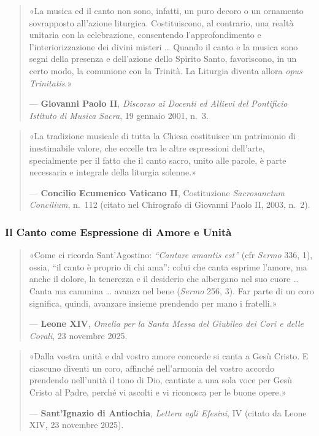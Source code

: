 \documentclass[12pt,a4paper]{article}
\begin{document}
	\begin{quote}
		«La musica ed il canto non sono, infatti, un puro decoro o un ornamento sovrapposto all'azione liturgica. Costituiscono, al contrario, una realtà unitaria con la celebrazione, consentendo l'approfondimento e l'interiorizzazione dei divini misteri \ldots{} Quando il canto e la musica sono segni della presenza e dell'azione dello Spirito Santo, favoriscono, in un certo modo, la comunione con la Trinità. La Liturgia diventa allora \emph{opus Trinitatis}.»
		
		--- \textbf{Giovanni Paolo II}, \emph{Discorso ai Docenti ed Allievi del Pontificio Istituto di Musica Sacra}, 19 gennaio 2001, n.~3.
	\end{quote}
	
	\begin{quote}
		«La tradizione musicale di tutta la Chiesa costituisce un patrimonio di inestimabile valore, che eccelle tra le altre espressioni dell'arte, specialmente per il fatto che il canto sacro, unito alle parole, è parte necessaria e integrale della liturgia solenne.»
		
		--- \textbf{Concilio Ecumenico Vaticano II}, Costituzione \emph{Sacrosanctum Concilium}, n.~112 (citato nel Chirografo di Giovanni Paolo II, 2003, n.~2).
	\end{quote}
	
	\subsubsection{Il Canto come Espressione di Amore e Unità}\label{il-canto-come-espressione-di-amore-e-unita}
	
	\begin{quote}
		«Come ci ricorda Sant'Agostino: \emph{``Cantare amantis est''} (cfr \emph{Sermo} 336, 1), ossia, ``il canto è proprio di chi ama'': colui che canta esprime l'amore, ma anche il dolore, la tenerezza e il desiderio che albergano nel suo cuore \ldots{} Canta ma cammina \ldots{} avanza nel bene (\emph{Sermo} 256, 3). Far parte di un coro significa, quindi, avanzare insieme prendendo per mano i fratelli.»
		
		--- \textbf{Leone XIV}, \emph{Omelia per la Santa Messa del Giubileo dei Cori e delle Corali}, 23 novembre 2025.
	\end{quote}
	
	\begin{quote}
		«Dalla vostra unità e dal vostro amore concorde si canta a Gesù Cristo. E ciascuno diventi un coro, affinché nell'armonia del vostro accordo prendendo nell'unità il tono di Dio, cantiate a una sola voce per Gesù Cristo al Padre, perché vi ascolti e vi riconosca per le buone opere.»
		
		--- \textbf{Sant'Ignazio di Antiochia}, \emph{Lettera agli Efesini}, IV (citato da Leone XIV, 23 novembre 2025).
	\end{quote}
	
\end{document}
